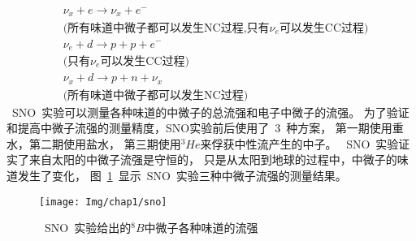 \begin{eqnarray}\label{eq:sno}
&\nu_x +e  \rightarrow \nu_x + e^- \\
& \text{(所有味道中微子都可以发生NC过程,只有$\nu_e$可以发生CC过程)} \nonumber \\
&\nu_e +d \rightarrow p + p + e^- \\
& \text{(只有$\nu_e$可以发生CC过程)} \nonumber \\
&\nu_x +d  \rightarrow p + n + \nu_x \\
& \text{(所有味道中微子都可以发生NC过程)} \nonumber
\end{eqnarray}
~SNO~实验可以测量各种味道的中微子的总流强和电子中微子的流强。
为了验证和提高中微子流强的测量精度，SNO实验前后使用了~3~种方案，
第一期使用重水，第二期使用盐水\citep{ahmed2004measurement}，
第三期使用$^{3}He$来俘获中性流产生的中子\citep{amsbaugh2007array}。
~SNO~实验证实了来自太阳的中微子流强是守恒的\citep{ahmad2001measurement}，
只是从太阳到地球的过程中，中微子的味道发生了变化，
图~\ref{fig:sno}~显示~SNO~实验三种中微子流强的测量结果。
\begin{figure}[!htbp]
  \centering
   \texttt{[image: Img/chap1/sno]}
    \caption{~SNO~实验给出的$^{8}B$中微子各种味道的流强}
  \label{fig:sno}
\end{figure}
